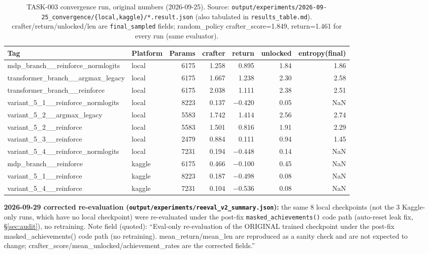 \documentclass[11pt]{article}
\newcommand{\srcpath}[1]{\texttt{\small #1}}
\begin{document}
\begin{table}[h]
\centering
\small
\caption{TASK-003 convergence run, original numbers (2026-09-25). Source: \srcpath{output/experiments/2026-09-25\_convergence/\{local,kaggle\}/*.result.json} (also tabulated in \srcpath{results\_table.md}). crafter/return/unlocked/len are \texttt{final\_sampled} fields; random\_policy crafter\_score=1.849, return=1.461 for every run (same evaluator).}
\begin{tabular}{llrrrrr}
\toprule
Tag & Platform & Params & crafter & return & unlocked & entropy(final) \\
\midrule
mdp\_branch\_\_reinforce\_normlogits & local & 6175 & 1.258 & 0.895 & 1.84 & 1.86 \\
transformer\_branch\_\_argmax\_legacy & local & 6175 & 1.667 & 1.238 & 2.30 & 2.58 \\
transformer\_branch\_\_reinforce & local & 6175 & 2.038 & 1.111 & 2.38 & 2.51 \\
variant\_5\_1\_\_reinforce\_normlogits & local & 8223 & 0.137 & $-$0.420 & 0.05 & NaN \\
variant\_5\_2\_\_argmax\_legacy & local & 5583 & 1.742 & 1.414 & 2.56 & 2.74 \\
variant\_5\_2\_\_reinforce & local & 5583 & 1.501 & 0.816 & 1.91 & 2.29 \\
variant\_5\_3\_\_reinforce & local & 2479 & 0.884 & 0.111 & 0.94 & 1.45 \\
variant\_5\_4\_\_reinforce\_normlogits & local & 7231 & 0.194 & $-$0.448 & 0.14 & NaN \\
mdp\_branch\_\_reinforce & kaggle & 6175 & 0.466 & $-$0.100 & 0.45 & NaN \\
variant\_5\_1\_\_reinforce & kaggle & 8223 & 0.187 & $-$0.498 & 0.08 & NaN \\
variant\_5\_4\_\_reinforce & kaggle & 7231 & 0.104 & $-$0.536 & 0.08 & NaN \\
\bottomrule
\end{tabular}
\end{table}

\textbf{2026-09-29 corrected re-evaluation (\srcpath{output/experiments/reeval\_v2\_summary.json}):}
the same 8 local checkpoints (not the 3 Kaggle-only runs, which have no local checkpoint) were
re-evaluated under the post-fix \texttt{masked\_achievements()} code path (auto-reset leak fix,
\S\ref{sec:audit}), no retraining. Note field (quoted): ``Eval-only re-evaluation of the ORIGINAL
trained checkpoint under the post-fix masked\_achievements() code path (no retraining).
mean\_return/mean\_len are reproduced as a sanity check and are not expected to change;
crafter\_score/mean\_unlocked/achievement\_rates are the corrected fields.''
\end{document}
